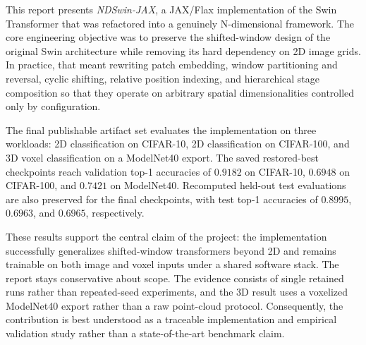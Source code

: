 This report presents \emph{NDSwin-JAX}, a JAX/Flax implementation of the Swin Transformer that was refactored into a genuinely N-dimensional framework. The core engineering objective was to preserve the shifted-window design of the original Swin architecture while removing its hard dependency on 2D image grids. In practice, that meant rewriting patch embedding, window partitioning and reversal, cyclic shifting, relative position indexing, and hierarchical stage composition so that they operate on arbitrary spatial dimensionalities controlled only by configuration.

The final publishable artifact set evaluates the implementation on three workloads: 2D classification on CIFAR-10, 2D classification on CIFAR-100, and 3D voxel classification on a ModelNet40 export. The saved restored-best checkpoints reach validation top-1 accuracies of \(0.9182\) on CIFAR-10, \(0.6948\) on CIFAR-100, and \(0.7421\) on ModelNet40. Recomputed held-out test evaluations are also preserved for the final checkpoints, with test top-1 accuracies of \(0.8995\), \(0.6963\), and \(0.6965\), respectively.

These results support the central claim of the project: the implementation successfully generalizes shifted-window transformers beyond 2D and remains trainable on both image and voxel inputs under a shared software stack. The report stays conservative about scope. The evidence consists of single retained runs rather than repeated-seed experiments, and the 3D result uses a voxelized ModelNet40 export rather than a raw point-cloud protocol. Consequently, the contribution is best understood as a traceable implementation and empirical validation study rather than a state-of-the-art benchmark claim.
